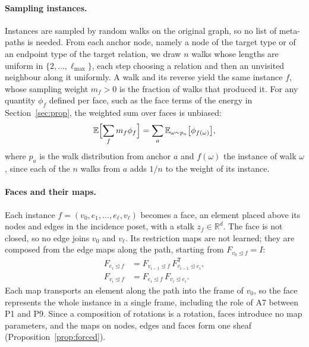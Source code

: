 \documentclass{article}
\newcommand{\R}{\mathbb{R}}
\newcommand{\transpose}{\mathsf{T}}
\newcommand{\inc}{\trianglelefteq}
\begin{document}
\paragraph{Sampling instances.} Instances are sampled by random walks on the original graph, so no list of meta-paths is needed. From each anchor node, namely a node of the target type or of an endpoint type of the target relation, we draw $n$ walks whose lengths are uniform in $\{2,\ldots,\ell_{\max}\}$, each step choosing a relation and then an unvisited neighbour along it uniformly. A walk and its reverse yield the same instance $f$, whose sampling weight $m_f>0$ is the fraction of walks that produced it. For any quantity $\phi_f$ defined per face, such as the face terms of the energy in Section~\ref{sec:prop}, the weighted sum over faces is unbiased:
\begin{equation}
  \mathbb{E}\Bigl[\sum_f m_f\phi_f\Bigr]=\sum_a\mathbb{E}_{\omega\sim p_a}\bigl[\phi_{f(\omega)}\bigr],
  \label{eq:unbiased}
\end{equation}
where $p_a$ is the walk distribution from anchor $a$ and $f(\omega)$ the instance of walk $\omega$, since each of the $n$ walks from $a$ adds $1/n$ to the weight of its instance.


\paragraph{Faces and their maps.} Each instance $f=(v_0,e_1,\ldots,e_\ell,v_\ell)$ becomes a face, an element placed above its nodes and edges in the incidence poset, with a stalk $z_f\in\R^d$. The face is not closed, so no edge joins $v_0$ and $v_\ell$. Its restriction maps are not learned; they are composed from the edge maps along the path, starting from $F_{v_0\inc f}=I$:
\begin{equation}
\begin{aligned}
  F_{e_i\inc f}&=F_{v_{i-1}\inc f}\,F_{v_{i-1}\inc e_i}^{\transpose},\\
  F_{v_i\inc f}&=F_{e_i\inc f}\,F_{v_i\inc e_i}.
\end{aligned}
\label{eq:forced}
\end{equation}
Each map transports an element along the path into the frame of $v_0$, so the face represents the whole instance in a single frame, including the role of A7 between P1 and P9. Since a composition of rotations is a rotation, faces introduce no map parameters, and the maps on nodes, edges and faces form one sheaf (Proposition~\ref{prop:forced}).
\end{document}
